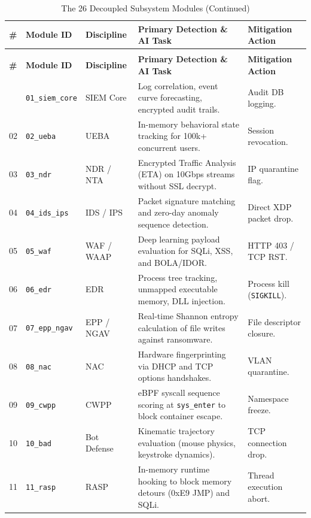 \documentclass[11pt,a4paper]{article}
\begin{document}
\setlength{\tabcolsep}{3pt}
\begin{footnotesize}
\begin{longtable}{@{}p{} p{} p{} p{} p{}@{}}
\caption{The 26 Decoupled Subsystem Modules in Blackbox Sentinel} \label{tab:modules} \\
\toprule
\textbf{\#} & \textbf{Module ID} & \textbf{Discipline} & \textbf{Primary Detection \& AI Task} & \textbf{Mitigation Action} \\ \midrule
\endfirsthead
\caption[]{The 26 Decoupled Subsystem Modules (Continued)} \\
\toprule
\textbf{\#} & \textbf{Module ID} & \textbf{Discipline} & \textbf{Primary Detection \& AI Task} & \textbf{Mitigation Action} \\ \midrule
\endhead
\bottomrule
\endfoot
01 & \texttt{01\_siem\_core} & SIEM Core & Log correlation, event curve forecasting, encrypted audit trails. & Audit DB logging. \\
02 & \texttt{02\_ueba} & UEBA & In-memory behavioral state tracking for 100k+ concurrent users. & Session revocation. \\
03 & \texttt{03\_ndr} & NDR / NTA & Encrypted Traffic Analysis (ETA) on 10Gbps streams without SSL decrypt. & IP quarantine flag. \\
04 & \texttt{04\_ids\_ips} & IDS / IPS & Packet signature matching and zero-day anomaly sequence detection. & Direct XDP packet drop. \\
05 & \texttt{05\_waf} & WAF / WAAP & Deep learning payload evaluation for SQLi, XSS, and BOLA/IDOR. & HTTP 403 / TCP RST. \\
06 & \texttt{06\_edr} & EDR & Process tree tracking, unmapped executable memory, DLL injection. & Process kill (\texttt{SIGKILL}). \\
07 & \texttt{07\_epp\_ngav} & EPP / NGAV & Real-time Shannon entropy calculation of file writes against ransomware. & File descriptor closure. \\
08 & \texttt{08\_nac} & NAC & Hardware fingerprinting via DHCP and TCP options handshakes. & VLAN quarantine. \\
09 & \texttt{09\_cwpp} & CWPP & eBPF syscall sequence scoring at \texttt{sys\_enter} to block container escape. & Namespace freeze. \\
10 & \texttt{10\_bad} & Bot Defense & Kinematic trajectory evaluation (mouse physics, keystroke dynamics). & TCP connection drop. \\
11 & \texttt{11\_rasp} & RASP & In-memory runtime hooking to block memory detours (0xE9 JMP) and SQLi. & Thread execution abort. \\

\end{longtable}
\end{footnotesize}
\end{document}
